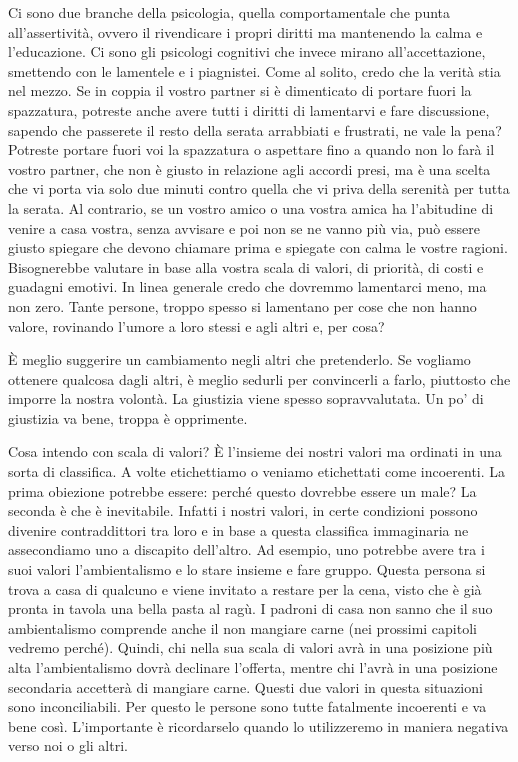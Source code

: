 \documentclass[12pt]{book} %
\begin{document}
Ci sono due branche della psicologia, quella comportamentale che punta all'assertività, ovvero il
rivendicare i propri diritti ma mantenendo la calma e l'educazione. Ci sono gli psicologi
cognitivi che invece mirano all'accettazione, smettendo con le lamentele e i piagnistei. Come al
solito, credo che la verità stia nel mezzo. Se in coppia il vostro partner si è dimenticato di portare fuori la
spazzatura, potreste anche avere tutti i diritti di lamentarvi e fare discussione, sapendo che passerete il resto della
serata arrabbiati e frustrati, ne vale la pena? Potreste portare fuori voi la spazzatura o aspettare fino a quando non
lo farà il vostro partner, che non è giusto in relazione agli accordi presi, ma è una scelta che vi porta via solo due
minuti contro quella che vi priva della serenità per tutta la serata. Al contrario, se un vostro amico o una vostra
amica ha l'abitudine di venire a casa vostra, senza avvisare e poi non se ne vanno più via, può
essere giusto spiegare che devono chiamare prima e spiegate con calma le vostre ragioni. Bisognerebbe valutare in base
alla vostra scala di valori, di priorità, di costi e guadagni emotivi. In linea generale credo che dovremmo lamentarci
meno, ma non zero. Tante persone, troppo spesso si lamentano per cose che non hanno valore, rovinando
l'umore a loro stessi e agli altri e, per cosa?

È meglio suggerire un cambiamento negli altri che pretenderlo. Se vogliamo ottenere qualcosa dagli altri, è meglio
sedurli per convincerli a farlo, piuttosto che imporre la nostra volontà. La giustizia viene spesso sopravvalutata. Un
po' di giustizia va bene, troppa è opprimente.


\bigskip

Cosa intendo con scala di valori? È l'insieme dei nostri valori ma ordinati in una sorta di
classifica. A volte etichettiamo o veniamo etichettati come incoerenti. La prima obiezione potrebbe essere: perché
questo dovrebbe essere un male? La seconda è che è inevitabile. Infatti i nostri valori, in certe condizioni possono
divenire contraddittori tra loro e in base a questa classifica immaginaria ne assecondiamo uno a discapito
dell'altro. Ad esempio, uno potrebbe avere tra i suoi valori l'ambientalismo
e lo stare insieme e fare gruppo. Questa persona si trova a casa di qualcuno e viene invitato a restare per la cena,
visto che è già pronta in tavola una bella pasta al ragù. I padroni di casa non sanno che il suo ambientalismo
comprende anche il non mangiare carne (nei prossimi capitoli vedremo perché). Quindi, chi nella sua scala di valori
avrà in una posizione più alta l'ambientalismo dovrà declinare l'offerta,
mentre chi l'avrà in una posizione secondaria accetterà di mangiare carne. Questi due valori in
questa situazioni sono inconciliabili. Per questo le persone sono tutte fatalmente incoerenti e va bene così.
L'importante è ricordarselo quando lo utilizzeremo in maniera negativa verso noi o gli altri.
\end{document}

